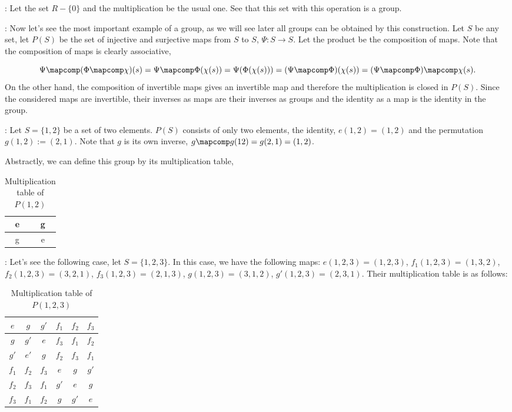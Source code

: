 \ejem:
Let the set $R-\{0\}$ and the multiplication be the usual one. See that this set with this operation is a group.

\ejem:
Now let's see the most important example of a group, as we will see later all groups can be obtained by this construction. Let $S$ be any set, let $P(S)$ be the set of injective and surjective maps from $S$ to $S$, $\Psi: S \to S$. 
Let the product be the composition of maps. Note that the composition of maps is clearly associative,

\[
\Psi \mapcomp (\Phi \mapcomp \chi)(s) = \Psi \mapcomp \Phi(\chi(s)) 
= \Psi(\Phi(\chi(s))) = (\Psi \mapcomp \Phi)(\chi(s))  = (\Psi \mapcomp \Phi)\mapcomp\chi(s).
\]
%
On the other hand, the composition of invertible maps gives an invertible map and therefore the multiplication is closed in $P(S)$. Since the considered maps are invertible, their inverses as maps are their inverses as groups and the identity as a map is the identity in the group.

\ejem:
Let $S=\{1,2\}$ be a set of two elements. $P(S)$ consists of only two elements, the identity, 
$e(1,2) = (1,2)$ and the permutation $g(1,2):=(2,1)$. 
Note that $g$ is its own inverse, $g\mapcomp g(12) = g(2,1) = (1,2)$.

Abstractly, we can define this group by its multiplication table,

\begin{table}[htp]
\caption{Multiplication table of $P(1,2)$}
\begin{center}
\begin{tabular}{|c|c|}
e & g \\
\hline
g & e
\end{tabular}
\end{center}
\label{tabla-15-1}
\end{table}%

\ejem:
Let's see the following case, let $S=\{1,2,3\}$. In this case, we have the following maps:
$e(1,2,3)=(1,2,3)$, $f_{1}(1,2,3)=(1,3,2)$, $f_{2}(1,2,3)=(3,2,1)$, $f_{3}(1,2,3)=(2,1,3)$, $g(1,2,3)=(3,1,2)$, $g'(1,2,3)=(2,3,1)$. Their multiplication table is as follows:

\begin{table}[htp]
\caption{Multiplication table of $P(1,2,3)$}
\begin{center}
\begin{tabular}{|c|c|c|c|c|c|}
\hline
$e$ & $g$ & $g'$ & $f_{1}$ & $f_{2}$ & $f_{3}$ \\
\hline
$g$ & $g'$ & $e$ & $f_{3}$ & $f_{1}$ & $f_{2}$ \\
\hline
$g'$ & $e'$ & $g$ & $f_{2}$ &  $f_{3}$ & $f_{1}$ \\
\hline
$f_{1}$ & $f_{2}$ & $f_{3}$ & $e$ & $g$ & $g'$  \\
\hline
$f_{2}$ & $f_{3}$ & $f_{1}$ & $g'$ & $e$ & $g$ \\
\hline
$f_{3}$ & $f_{1}$ & $f_{2}$ & $g$ & $g'$ & $e$ \\
\hline
\end{tabular}
\end{center}
\label{tabla-15-2}
\end{table}%


